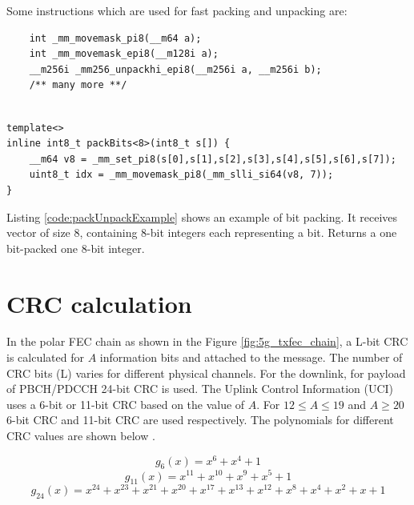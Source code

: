 Some instructions which are used for fast packing and unpacking are:
\begin{code}
	\label{code:samplepackUnpack}
\begin{verbatim}
	int _mm_movemask_pi8(__m64 a);
	int _mm_movemask_epi8(__m128i a);
	__m256i _mm256_unpackhi_epi8(__m256i a, __m256i b);
	/** many more **/
	
\end{verbatim}
\end{code}


\begin{code}
	\label{code:packUnpackExample}
	\begin{verbatim}
template<>
inline int8_t packBits<8>(int8_t s[]) {
	__m64 v8 = _mm_set_pi8(s[0],s[1],s[2],s[3],s[4],s[5],s[6],s[7]);	
	uint8_t idx = _mm_movemask_pi8(_mm_slli_si64(v8, 7));
}
\end{verbatim}
\end{code}

Listing \ref{code:packUnpackExample} shows an example of bit packing. It receives vector of size 8, containing 8-bit integers each representing a bit. Returns a one bit-packed one 8-bit integer.

\section{CRC calculation}
In the polar FEC chain as shown in the Figure \ref{fig:5g_txfec_chain}, a L-bit CRC is calculated for $A$ information bits and attached to the message. The number of CRC bits (L) varies for different physical channels. For the downlink, for payload of PBCH/PDCCH 24-bit CRC is used. The Uplink Control Information (UCI) uses a 6-bit or 11-bit CRC based on the value of $A$. For $12 \leq A \leq 19$ and $A \geq 20$ 6-bit CRC and 11-bit CRC are used respectively. The polynomials for different CRC values are shown below \cite{3gpp.38.212}.

\begin{equation} \label{crc_polynomial6}
g_{6}(x) = x^{6} + x^{4} + 1
\end{equation}
\begin{equation} \label{crc_polynomial11}
g_{11}(x) = x^{11} + x^{10} + x^{9} + x^{5} + 1
\end{equation}
\begin{equation} \label{crc_polynomial24}
g_{24}(x) = x^{24} + x^{23} + x^{21} + x^{20} + x^{17} + x^{13} + x^{12} + x^{8} + x^{4} + x^{2} + x + 1
\end{equation}

